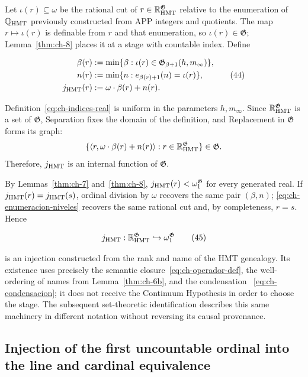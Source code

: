 Let \(\iota(r)\subseteq\omega\) be the rational cut of
\(r\in\mathbb R_{\rm HMT}^{\mathfrak G}\) relative to the enumeration of
\(\mathbb Q_{\rm HMT}\) previously constructed from APP integers and
quotients. The map \(r\mapsto\iota(r)\) is definable from \(r\) and that
enumeration, so \(\iota(r)\in\mathfrak G\); Lemma~\ref{thm:ch-8} places it at
a stage with countable index. Define

\[
 \begin{aligned}
  \beta(r)&:=\min\{\beta:
       \iota(r)\in\mathfrak G_{\beta+1}(h,m_\infty)\},\\
  n(r)&:=\min\{n:e_{\beta(r)+1}(n)=\iota(r)\},\\
  j_{\rm HMT}(r)&:=\omega\cdot\beta(r)+n(r).
 \end{aligned}
\tag{44}\label{eq:ch-indices-real}
\]

Definition~\eqref{eq:ch-indices-real} is uniform in the parameters
\(h,m_\infty\). Since \(\mathbb R_{\rm HMT}^{\mathfrak G}\) is a set of
\(\mathfrak G\), Separation fixes the domain of the definition, and
Replacement in \(\mathfrak G\) forms its graph:
\[
 \{\langle r,\omega\cdot\beta(r)+n(r)\rangle:
 r\in\mathbb R_{\rm HMT}^{\mathfrak G}\}\in\mathfrak G.
\]
Therefore, \(j_{\rm HMT}\) is an internal function of \(\mathfrak G\).

By Lemmas~\ref{thm:ch-7} and~\ref{thm:ch-8},
\(j_{\rm HMT}(r)<\omega_1^{\mathfrak G}\) for every generated real. If
\(j_{\rm HMT}(r)=j_{\rm HMT}(s)\), ordinal division by \(\omega\) recovers the
same pair \((\beta,n)\); \eqref{eq:ch-enumeracion-niveles} recovers the same
rational cut and, by completeness, \(r=s\). Hence

\[
 j_{\rm HMT}:\mathbb R_{\rm HMT}^{\mathfrak G}
 \hookrightarrow\omega_1^{\mathfrak G}
\tag{45}\label{eq:ch-inyeccion-j}
\]

is an injection constructed from the rank and name of the HMT genealogy. Its
existence uses precisely the semantic closure~\eqref{eq:ch-operador-def}, the
well-ordering of names from Lemma~\ref{thm:ch-6b}, and the condensation
~\eqref{eq:ch-condensacion}; it does not receive the Continuum Hypothesis in
order to choose the stage. The subsequent set-theoretic identification
describes this same machinery in different notation without reversing its
causal provenance.

\subsection{Injection of the first uncountable ordinal into the line and cardinal equivalence}

